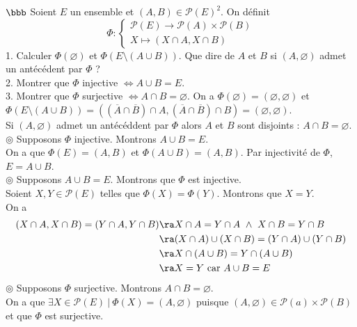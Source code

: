 \documentclass[11pt]{article}
\begin{document}
\begin{exercice}{$\bbb$}{}
    Soient $E$ un ensemble et $(A,B)\in\mathcal{P}(E)^2$. On définit
    \begin{equation*}
        \Phi : \begin{cases}\mathcal{P}(E) \to \mathcal{P}(A) \times \mathcal{P}(B)\\X \mapsto (X \cap A, X \cap B)\end{cases}
    \end{equation*}
    1. Calculer $\Phi(\varnothing)$ et $\Phi(E \setminus (A \cup B))$. Que dire de $A$ et $B$ si $(A, \varnothing)$ admet un antécédent par $\Phi$ ?\\
    2. Montrer que $\Phi$ injective $\iff A \cup B = E$.\\
    3. Montrer que $\Phi$ surjective $\iff A \cap B = \varnothing$.
    \tcblower
     On a $\Phi(\varnothing) = (\varnothing, \varnothing)$ et $\Phi(E \setminus (A \cup B)) = ((\overline{A} \cap \overline{B}) \cap A, (\overline{A} \cap \overline{B}) \cap B) = (\varnothing, \varnothing)$.\\
    Si $(A, \varnothing)$ admet un antécéddent par $\Phi$ alors $A$ et $B$ sont disjoints : $A \cap B = \varnothing$.\\[0.15cm]
    $\circledcirc$ Supposons $\Phi$ injective. Montrons $A \cup B = E$.\\
    On a que $\Phi(E) = (A,B)$ et $\Phi(A \cup B)=(A,B)$. Par injectivité de $\Phi$, $E = A \cup B$.\\[0.1cm]
    $\circledcirc$ Supposons $A \cup B = E$. Montrons que $\Phi$ est injective.\\
    Soient $X,Y \in \mathcal{P}(E)$ telles que $\Phi(X) = \Phi(Y)$. Montrons que $X = Y$.\\
    On a
    \begin{align*}
        (X \cap A, X \cap B) = (Y \cap A, Y \cap B) &\ra X\cap A = Y \cap A ~ \wedge ~ X \cap B = Y \cap B\\
        &\ra (X \cap A) \cup (X \cap B) = (Y \cap A) \cup (Y \cap B)\\
        &\ra X \cap (A \cup B) = Y \cap (A \cup B)\\
        &\ra X = Y ~ \text{car } A \cup B = E 
    \end{align*}
    $\circledcirc$ Supposons $\Phi$ surjective. Montrons $A \cap B = \varnothing$.\\
    On a que $\exists X \in \mathcal{P}(E) ~ | ~ \Phi(X) = (A, \varnothing)$ puisque $(A, \varnothing) \in \mathcal{P}(a) \times \mathcal{P}(B)$ et que $\Phi$ est surjective.\\

\end{exercice}
\end{document}

